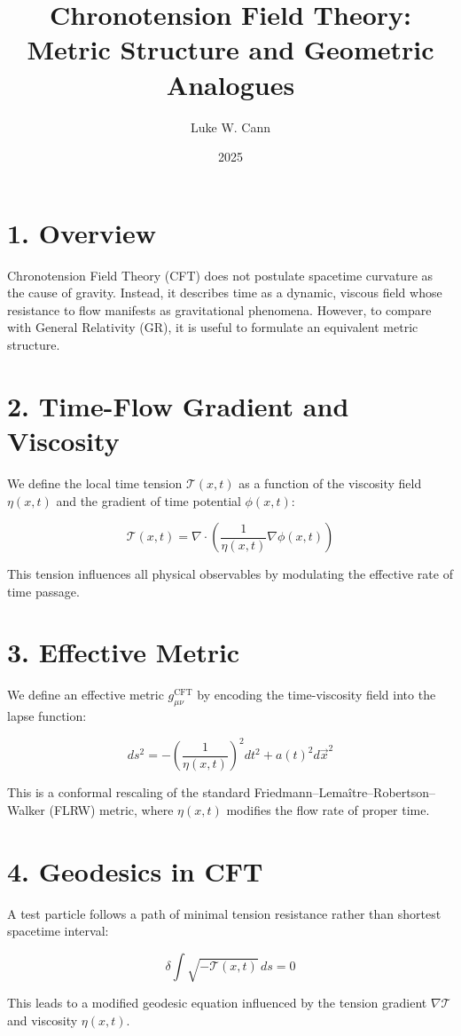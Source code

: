 \documentclass{article}
\title{Chronotension Field Theory: Metric Structure and Geometric Analogues}
\author{Luke W. Cann}
\date{2025}
\begin{document}
\maketitle

\section*{1. Overview}
Chronotension Field Theory (CFT) does not postulate spacetime curvature as the cause of gravity. Instead, it describes time as a dynamic, viscous field whose resistance to flow manifests as gravitational phenomena. However, to compare with General Relativity (GR), it is useful to formulate an equivalent metric structure.

\section*{2. Time-Flow Gradient and Viscosity}
We define the local time tension $\mathcal{T}(x,t)$ as a function of the viscosity field $\eta(x,t)$ and the gradient of time potential $\phi(x,t)$:

\[
\mathcal{T}(x,t) = \nabla \cdot \left( \frac{1}{\eta(x,t)} \nabla \phi(x,t) \right)
\]

This tension influences all physical observables by modulating the effective rate of time passage.

\section*{3. Effective Metric}
We define an effective metric $g_{\mu\nu}^{\text{CFT}}$ by encoding the time-viscosity field into the lapse function:

\[
ds^2 = -\left( \frac{1}{\eta(x,t)} \right)^2 dt^2 + a(t)^2 d\vec{x}^2
\]

This is a conformal rescaling of the standard Friedmann–Lemaître–Robertson–Walker (FLRW) metric, where $\eta(x,t)$ modifies the flow rate of proper time.

\section*{4. Geodesics in CFT}
A test particle follows a path of minimal tension resistance rather than shortest spacetime interval:

\[
\delta \int \sqrt{-\mathcal{T}(x,t)} \, ds = 0
\]

This leads to a modified geodesic equation influenced by the tension gradient $\nabla \mathcal{T}$ and viscosity $\eta(x,t)$.
\end{document}
